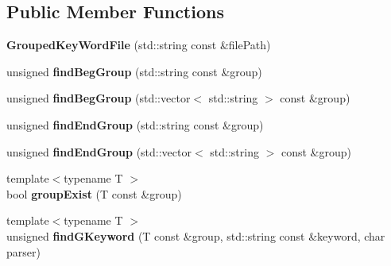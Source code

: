 \subsection*{Public Member Functions}
\begin{DoxyCompactItemize}
\item 
\hypertarget{classstb_1_1GroupedKeyWordFile_af4ad3ffd40c138ccd42b697d66b0f9a1}{{\bfseries Grouped\+Key\+Word\+File} (std\+::string const \&file\+Path)}\label{classstb_1_1GroupedKeyWordFile_af4ad3ffd40c138ccd42b697d66b0f9a1}

\item 
\hypertarget{classstb_1_1GroupedKeyWordFile_a5f0cf323774475b425529245c917237b}{unsigned {\bfseries find\+Beg\+Group} (std\+::string const \&group)}\label{classstb_1_1GroupedKeyWordFile_a5f0cf323774475b425529245c917237b}

\item 
\hypertarget{classstb_1_1GroupedKeyWordFile_a82ef006787e3e3a9a16fd55697c72355}{unsigned {\bfseries find\+Beg\+Group} (std\+::vector$<$ std\+::string $>$ const \&group)}\label{classstb_1_1GroupedKeyWordFile_a82ef006787e3e3a9a16fd55697c72355}

\item 
\hypertarget{classstb_1_1GroupedKeyWordFile_a8e8774701265c7e309f7d703760ab23f}{unsigned {\bfseries find\+End\+Group} (std\+::string const \&group)}\label{classstb_1_1GroupedKeyWordFile_a8e8774701265c7e309f7d703760ab23f}

\item 
\hypertarget{classstb_1_1GroupedKeyWordFile_ae5b0c0aff439c09c5c62abf021adae54}{unsigned {\bfseries find\+End\+Group} (std\+::vector$<$ std\+::string $>$ const \&group)}\label{classstb_1_1GroupedKeyWordFile_ae5b0c0aff439c09c5c62abf021adae54}

\item 
\hypertarget{classstb_1_1GroupedKeyWordFile_a9dc708347bde21ed7b1d0bcee4b6bef6}{{\footnotesize template$<$typename T $>$ }\\bool {\bfseries group\+Exist} (T const \&group)}\label{classstb_1_1GroupedKeyWordFile_a9dc708347bde21ed7b1d0bcee4b6bef6}

\item 
\hypertarget{classstb_1_1GroupedKeyWordFile_acf419005c84202620663bed18a1da9b5}{{\footnotesize template$<$typename T $>$ }\\unsigned {\bfseries find\+G\+Keyword} (T const \&group, std\+::string const \&keyword, char parser)}\label{classstb_1_1GroupedKeyWordFile_acf419005c84202620663bed18a1da9b5}


\end{DoxyCompactItemize}
